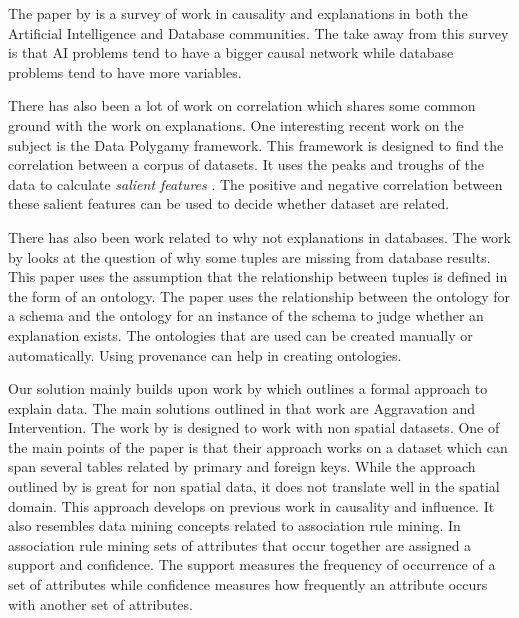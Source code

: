 The paper by \cite{meliou2014causality} is a survey of work in causality and explanations in both the Artificial Intelligence and Database communities. The take away from this survey is that AI problems tend to have a bigger causal network while database problems tend to have more variables.

There has also been a lot of work on correlation which shares some common ground with the work on explanations. One interesting recent work on the subject is the Data Polygamy framework\citep{chirigati2016data}. This framework is designed to find the correlation between a corpus of datasets. It uses the peaks and troughs of the data to calculate \textit{salient features} \citep{dunn1986applied}. The positive and negative correlation between these salient features can be used to decide whether dataset are related\citep{su2014supporting}.

There has also been work related to why not explanations in databases. The work by \citep{ten2015high} looks at the question of why some tuples are missing from database results. This paper uses the assumption that the relationship between tuples is defined in the form of an ontology. The paper uses the relationship between the ontology for a schema and the ontology for an instance of the schema to judge whether an explanation exists. The ontologies that are used can be created manually or automatically. Using provenance \citep{cheney2009provenance} can help in creating ontologies.

Our solution mainly builds upon work by \cite{roy2014formal} which outlines a formal approach to explain data. The main solutions outlined in that work are Aggravation and Intervention. The work by \cite{roy2014formal} is designed to work with non spatial datasets. One of the main points of the paper is that their approach works on a dataset which can span several tables related by primary and foreign keys. While the approach outlined by \cite{roy2014formal} is great for non spatial data, it does not translate well in the spatial domain. This approach develops on previous work in causality and influence. It also resembles data mining concepts related to association rule mining\citep{agarwal1994fast,tan2006introduction}. In association rule mining sets of attributes that occur together are assigned a support and confidence. The support measures the frequency of occurrence of a set of attributes while confidence measures how frequently an attribute occurs with another set of attributes.


